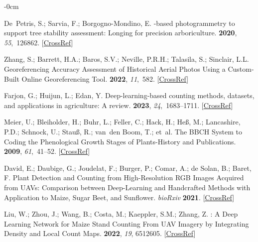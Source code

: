 \documentclass[12pt,a4paper,oneside]{report}
\newlength{\extralength}
\begin{document}
\begin{adjustwidth}{-\extralength}{0cm}
\begin{thebibliography}{999}
De~Petris, S.; Sarvia, F.; Borgogno-Mondino, E.
-based photogrammetry to support tree stability assessment:
{Longing} for precision arboriculture.
 {\bf 2020}, {\em 55},~126862. [\href{http://dx.doi.org/10.1016/j.ufug.2020.126862}{CrossRef}]

Zhang, S.; Barrett, H.A.; Baros, S.V.; Neville, P.R.H.; Talasila, S.; Sinclair,
L.L.
\newblock Georeferencing {Accuracy} {Assessment} of {Historical} {Aerial}
{Photos} {Using} a {Custom}-{Built} {Online} {Georeferencing} {Tool}.
 {\bf 2022}, {\em
11},~582. [\href{http://dx.doi.org/10.3390/ijgi11120582}{CrossRef}]

Farjon, G.; Huijun, L.; Edan, Y.
\newblock Deep-learning-based counting methods, datasets, and applications in
agriculture: A review.
 {\bf 2023}, {\em 24},~1683--1711. [\href{http://dx.doi.org/10.1007/s11119-023-10034-8}{CrossRef}]

Meier, U.; Bleiholder, H.; Buhr, L.; Feller, C.; Hack, H.; He{\ss}, M.;
Lancashire, P.D.; Schnock, U.; Stau{\ss}, R.; van~den Boom, T.;  et~al.
\newblock The {{BBCH}} System to Coding the Phenological Growth Stages of
Plants-History and Publications.
 {\bf 2009}, {\em 61},~41--52. [\href{http://dx.doi.org/10.5073/JfK.2009.02.01}{CrossRef}]

David, E.; Daubige, G.; Joudelat, F.; Burger, P.; Comar, A.; {de Solan}, B.;
Baret, F.
\newblock Plant Detection and Counting from High-Resolution {{RGB}} Images
Acquired from {{UAVs}}: Comparison between Deep-Learning and Handcrafted
Methods with Application to Maize, Sugar Beet, and Sunflower. {\em bioRxiv} {\bf2021}. [\href{http://dx.doi.org/10.1101/2021.04.27.441631}{CrossRef}]

Liu, W.; Zhou, J.; Wang, B.; Costa, M.; Kaeppler, S.M.; Zhang, Z.
: {{A Deep Learning Network}} for {{Maize Stand
Counting From UAV Imagery}} by {{Integrating Density}} and {{Local Count
Maps}}.
 {\bf 2022}, {\em
19}, 6512605. [\href{http://dx.doi.org/10.1109/LGRS.2022.3186544}{CrossRef}]


\end{thebibliography}
\end{adjustwidth}
\end{document}
